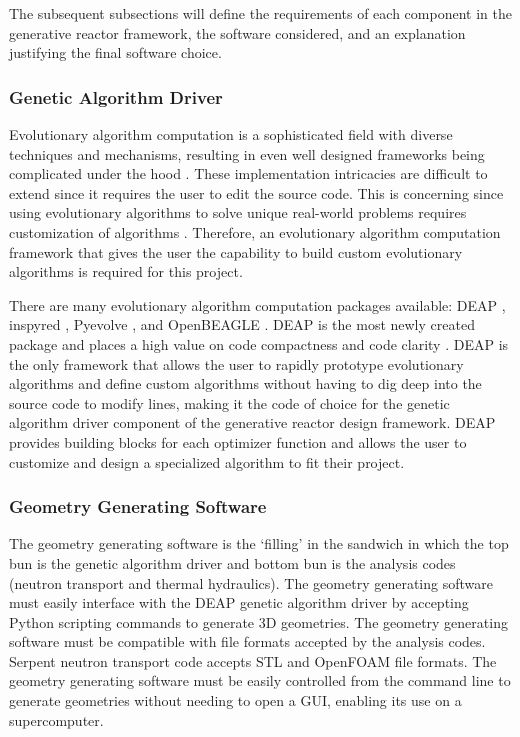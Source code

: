 The subsequent subsections will define the requirements of each 
component in the generative reactor framework, the software considered, 
and an explanation justifying the final software choice. 

\subsubsection{Genetic Algorithm Driver}
Evolutionary algorithm computation is a sophisticated field with diverse
techniques and mechanisms, resulting in even well designed frameworks 
being complicated under the hood \cite{fortin_deap_2012}. 
These implementation intricacies are difficult to extend since it requires 
the user to edit the source code. 
This is concerning since using evolutionary algorithms to solve unique 
real-world problems requires customization of algorithms 
\cite{fortin_deap_2012}. 
Therefore, an evolutionary algorithm computation framework that gives 
the user the capability to build custom evolutionary algorithms is 
required for this project. 

There are many evolutionary algorithm computation packages 
available: \gls{DEAP} \cite{fortin_deap_2012}, 
inspyred \cite{garrett_inspyred_2014}, 
Pyevolve \cite{perone_pyevolve_2009}, and
OpenBEAGLE \cite{gagne_open_2002}. 
DEAP is the most newly created package and places a high value on 
code compactness and code clarity \cite{fortin_deap_2012}. 
\gls{DEAP} is the only framework that allows the user to rapidly 
prototype evolutionary algorithms and define custom algorithms without 
having to dig deep into the source code to modify lines, making it 
the code of choice for the genetic algorithm driver component of 
the generative reactor design framework. 
\gls{DEAP} provides building blocks for each optimizer function and 
allows the user to customize and design a specialized algorithm 
to fit their project. 

\subsubsection{Geometry Generating Software}
The geometry generating software is the `filling' in the sandwich in which 
the top bun is the genetic algorithm driver and bottom bun is the 
analysis codes (neutron transport and thermal hydraulics). 
The geometry generating software must easily interface with the
\gls{DEAP} genetic algorithm driver by accepting Python scripting commands to 
generate 3D geometries. 
The geometry generating software must be compatible with file formats 
accepted by the analysis codes. 
Serpent neutron transport code accepts STL and OpenFOAM file formats. 
The geometry generating software must be easily controlled from the command line
to generate geometries without needing to open a \gls{GUI}, enabling its use 
on a supercomputer. 

